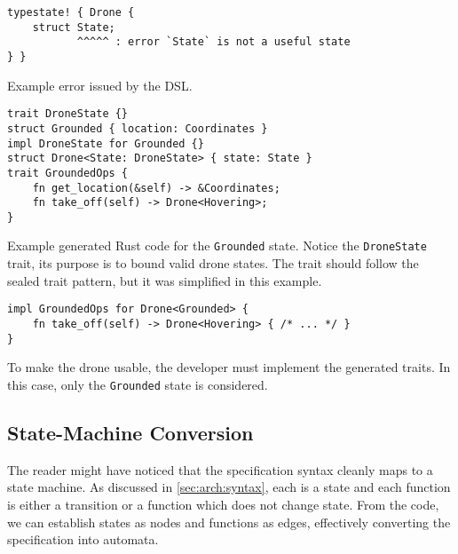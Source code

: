 \begin{listing}
    \centering
    \begin{verbatim}
typestate! { Drone {
    struct State;
           ^^^^^ : error `State` is not a useful state
} }
    \end{verbatim}
    \caption{
        Example error issued by the DSL.
    }
    \label{lst:dsl-typestate-error}
\end{listing}

\begin{listing}
    \centering
    \begin{verbatim}
trait DroneState {}
struct Grounded { location: Coordinates }
impl DroneState for Grounded {}
struct Drone<State: DroneState> { state: State }
trait GroundedOps {
    fn get_location(&self) -> &Coordinates;
    fn take_off(self) -> Drone<Hovering>;
}
    \end{verbatim}
    \caption{
        Example generated Rust code for the \texttt{Grounded} state.
        Notice the \texttt{DroneState} trait, its purpose is to bound valid drone states.
        The trait should follow the sealed trait pattern, but it was simplified in this example.
    }
    \label{lst:dsl-typestate-generated}
\end{listing}


\begin{listing}
    \centering
    \begin{verbatim}
impl GroundedOps for Drone<Grounded> {
    fn take_off(self) -> Drone<Hovering> { /* ... */ }
}
    \end{verbatim}
    \caption{
        To make the drone usable, the developer must implement the generated traits.
        In this case, only the \texttt{Grounded} state is considered.
    }
    \label{lst:dsl-typestate-impl}
\end{listing}

\subsection{State-Machine Conversion}
The reader might have noticed that the specification syntax cleanly maps to a state machine.
As discussed in \autoref{sec:arch:syntax}, each  is a state and each function is either a transition or a function which does not change state.
From the code, we can establish states as nodes and functions as edges,
effectively converting the specification into automata.

